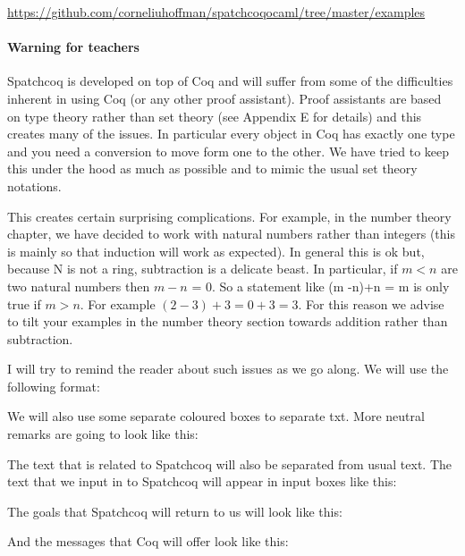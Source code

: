 \url{https://github.com/corneliuhoffman/spatchcoqocaml/tree/master/examples}
\paragraph{\bf Warning for teachers}\label{subsec:warnings}

Spatchcoq is developed on top of Coq and  will suffer from some of the difficulties inherent in using Coq (or any other proof assistant). Proof assistants are based on type theory rather than set theory (see Appendix E for details) and this creates many of the issues. In particular every object in Coq has exactly one type and you need a conversion to move form one to the other. We have tried to keep this under the hood as much as possible and to mimic the usual set theory notations.

This creates certain surprising complications. For example, in the number theory chapter, we have decided to work with natural numbers rather than integers (this is mainly so that induction will work as expected). In general this is ok but, because N is not a ring, subtraction is a delicate beast. In particular, if $m < n$ are two natural numbers then $m - n$ = 0. So a statement like (m -n)+n = m is only true if $m > n$. For example $(2-3)+3 = 0+3 = 3$. For this reason we advise to tilt your examples in the number theory section towards addition rather than
subtraction. 

I will try to remind the reader about such issues as we go along. We will use the following format:

We will also use some separate coloured boxes to separate txt. More neutral remarks are going to look like this:


The text that is related to Spatchcoq will also be separated from usual text. The text that we input in to Spatchcoq will appear in input boxes like this:

The goals that Spatchcoq   will return to us will look like this:

And the messages that Coq will offer look like this:



 


